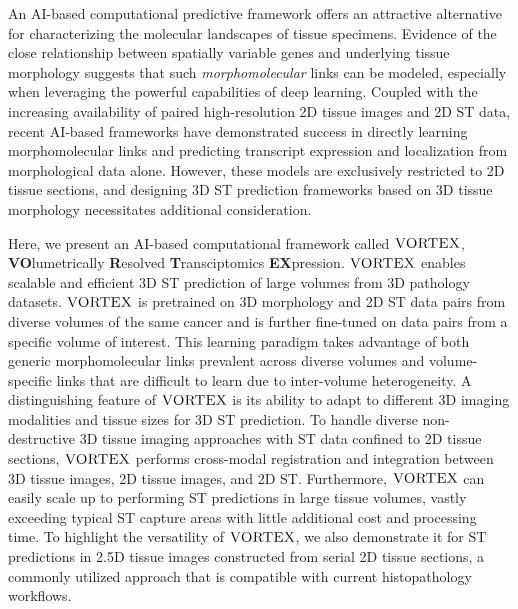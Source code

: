 An AI-based computational predictive framework offers an attractive alternative for characterizing the molecular landscapes of tissue specimens.
Evidence of the close relationship between spatially variable genes and underlying tissue morphology \cite{edsgard2018identification, svensson2018spatialde, sun2020statistical, binder2021morphological, ash2021joint, hu2021spagcn, song2023artificial} suggests that such \textit{morphomolecular} links can be modeled, especially when leveraging the powerful capabilities of deep learning. Coupled with the increasing availability of paired high-resolution 2D tissue images and 2D ST data\cite{moses2022museum, marx2021method, jaume2024hest, chen2024stimagekm}, recent AI-based frameworks have demonstrated success in directly learning morphomolecular links and predicting transcript expression and localization from morphological data alone\cite{he2020integrating, hu2021spagcn, bergenstraahle2022super, xie2024spatially, chung2024accurate, coleman2024unlocking, kueckelhaus2024inferring, zhang2024inferring, lee2024Path}. 
However, these models are exclusively restricted to 2D tissue sections, and designing 3D ST prediction frameworks based on 3D tissue morphology necessitates additional consideration. 

Here, we present an AI-based computational framework called $\textsc{VORTEX}$, \textbf{VO}lumetrically \textbf{R}esolved \textbf{T}ransciptomics \textbf{EX}pression. $\textsc{VORTEX}$ enables scalable and efficient 3D ST prediction of large volumes from 3D pathology datasets.
$\textsc{VORTEX}$ is pretrained on 3D morphology and 2D ST data pairs from diverse volumes of the same cancer and is further fine-tuned on data pairs from a specific volume of interest. This learning paradigm takes advantage of both generic morphomolecular links prevalent across diverse volumes and volume-specific links that are difficult to learn due to inter-volume heterogeneity.
A distinguishing feature of $\textsc{VORTEX}$ is its ability to adapt to different 3D imaging modalities and tissue sizes for 3D ST prediction.
To handle diverse non-destructive 3D tissue imaging approaches\cite{withers2021x, palermo2025investigating, glaser2017light, bishop2024end} with ST data confined to 2D tissue sections, $\textsc{VORTEX}$ performs cross-modal registration and integration between 3D tissue images, 2D tissue images, and 2D ST. Furthermore, $\textsc{VORTEX}$ can easily scale up to performing ST predictions in large tissue volumes, vastly exceeding typical ST capture areas with little additional cost and processing time. To highlight the versatility of $\textsc{VORTEX}$, we also demonstrate it for ST predictions in 2.5D tissue images constructed from serial 2D tissue sections, a commonly utilized approach that is compatible with current histopathology workflows.